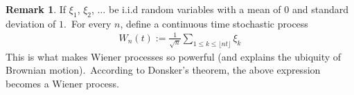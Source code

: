 \documentclass[12pt, a4paper]{article}
\numberwithin{equation}{section}
\theoremstyle{definition}
\theoremstyle{definition}
\newtheorem{remark}[thm]{Remark} %
\begin{document}
	\begin{remark}
		If $\xi_{1}$, $\xi_{2}$, $\dots$ be i.i.d random variables with a mean of $0$ and standard deviation of $1$.\ For every $n$, define a continuous time stochastic process 
		\begin{align}\label{random_walk_Wiener}
			W_{n}(t) := \frac{1}{\sqrt{n}}\sum_{1\leq k\leq\lfloor nt \rfloor}\xi_{k} 
		\end{align}
		This is what makes Wiener processes so powerful (and explains the ubiquity of Brownian motion).\ According to Donsker's theorem, the  above expression becomes a Wiener process.
	\end{remark}

	\newpage 
	

	\appendix 
	
		
	
	\newpage 
	\printbibliography
\end{document}
